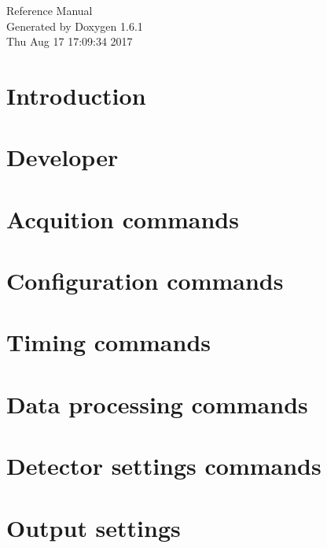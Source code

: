 \documentclass[a4paper]{article}
\begin{document}
\hypersetup{pageanchor=false}
\begin{titlepage}
\vspace*{7cm}
\begin{center}
{\Large Reference Manual}\\
\vspace*{1cm}
{\large Generated by Doxygen 1.6.1}\\
\vspace*{0.5cm}
{\small Thu Aug 17 17:09:34 2017}\\
\end{center}
\end{titlepage}
\tableofcontents
{}
\hypersetup{pageanchor=true}
\section{Introduction}
\label{index}\hypertarget{index}{}
\section{Developer}
\label{test}
\hypertarget{test}{}

\section{Acquition commands}
\label{acquisition}
\hypertarget{acquisition}{}

\section{Configuration commands}
\label{config}
\hypertarget{config}{}

\section{Timing commands}
\label{timing}
\hypertarget{timing}{}

\section{Data processing commands}
\label{data}
\hypertarget{data}{}

\section{Detector settings commands}
\label{settings}
\hypertarget{settings}{}

\section{Output settings}
\label{output}
\hypertarget{output}{}

\end{document}
